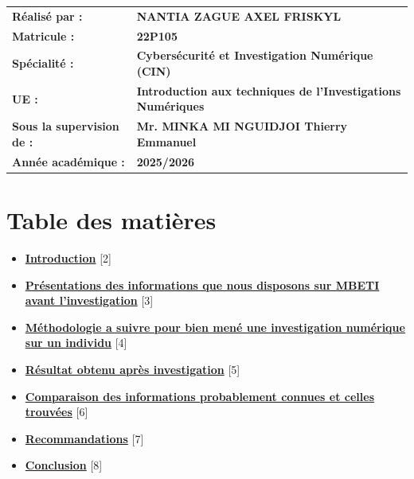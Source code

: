 \documentclass[12pt, a4paper]{article}
\begin{document}
\begin{titlepage}
		\begin{tabular}{@{}>{\bfseries}l l@{}}
			\vspace{0.5cm}
			Réalisé par : & \textbf{NANTIA ZAGUE AXEL FRISKYL} \\
			\vspace{0.5cm}
			Matricule : & \textbf{22P105} \\
			\vspace{0.5cm}
			Spécialité : & \textbf{Cybersécurité et Investigation Numérique (CIN)} \\
			\vspace{0.5cm}
			UE : & \textbf{Introduction aux techniques de l'Investigations Numériques} \\
			\vspace{0.5cm}
			Sous la supervision de : & \textbf{Mr. MINKA MI NGUIDJOI Thierry Emmanuel} \\
			\vspace{0.5cm}
			Année académique : & \textbf{2025/2026} \\
		\end{tabular}
		
	\end{titlepage}
	
	\newpage
	
	\section*{Table des matières}
	
	\begin{itemize}[leftmargin=*]
		\item \hyperref[introduction]{\textbf{Introduction}} [2]
		\item \hyperref[presentation]{\textbf{Présentations des informations que nous disposons sur MBETI avant l'investigation}} [3]
		\item \hyperref[methodologie]{\textbf{Méthodologie a suivre pour bien mené une investigation numérique sur un individu}} [4]
		\item \hyperref[resultats]{\textbf{Résultat obtenu après investigation}} [5]
		\item \hyperref[comparaison]{\textbf{Comparaison des informations probablement connues et celles trouvées}} [6]
		\item \hyperref[recommandations]{\textbf{Recommandations}} [7]
		\item \hyperref[conclusion]{\textbf{Conclusion}} [8]
	\end{itemize}
	
\end{document}
